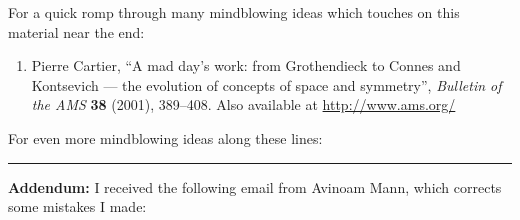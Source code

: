 \documentclass{article}
\def\tightlist{}
\renewcommand{\texttt}[1]{%
  \begingroup
  \ttfamily
  \begingroup\lccode`~=`/\lowercase{\endgroup\def~}{/\discretionary{}{}{}}%
  \begingroup\lccode`~=`[\lowercase{\endgroup\def~}{[\discretionary{}{}{}}%
  \begingroup\lccode`~=`.\lowercase{\endgroup\def~}{.\discretionary{}{}{}}%
  \catcode`/=\active\catcode`[=\active\catcode`.=\active
  \scantokens{#1\noexpand}%
  \endgroup
}
\begin{document}
For a quick romp through many mindblowing ideas which touches on this
material near the end:

\begin{enumerate}
\def\labelenumi{\arabic{enumi})}
\setcounter{enumi}{7}
\tightlist
\item
  Pierre Cartier, ``A mad day's work: from Grothendieck to Connes and
  Kontsevich --- the evolution of concepts of space and symmetry'',
  \emph{Bulletin of the AMS} \textbf{38} (2001), 389--408. Also
  available at
  \href{http://www.ams.org/joursearch/servlet/DoSearch?sendit=Search\&f1=msc\&v1=\&co1=and\&f2=title\&v2=\&co2=and\&f3=anywhere\&v3=\&co3=and\&f4=author\&v4=cartier\&jrnl=all\&onejrnl=\&startmo=00\&startyr=0000\&endmo=00\&endyr=0000\&format=standard\&sperpage=30\&cperpage=50\&ssort=d\&cso}{http://www.ams.org/}
\end{enumerate}

For even more mindblowing ideas along these lines:


\begin{center}\rule{0.5\linewidth}{0.5pt}\end{center}

\textbf{Addendum:} I received the following email from Avinoam Mann,
which corrects some mistakes I made:
\end{document}
